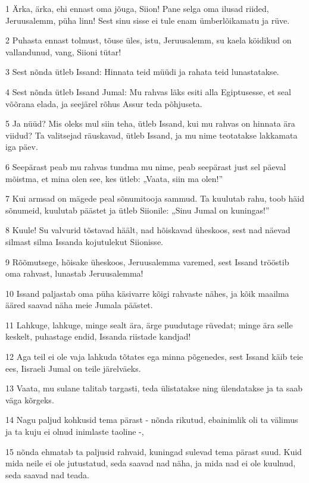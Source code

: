 \par 1 Ärka, ärka, ehi ennast oma jõuga, Siion! Pane selga oma ilusad riided, Jeruusalemm, püha linn! Sest sinu sisse ei tule enam ümberlõikamatu ja rüve.
\par 2 Puhasta ennast tolmust, tõuse üles, istu, Jeruusalemm, su kaela köidikud on vallandunud, vang, Siioni tütar!
\par 3 Sest nõnda ütleb Issand: Hinnata teid müüdi ja rahata teid lunastatakse.
\par 4 Sest nõnda ütleb Issand Jumal: Mu rahvas läks esiti alla Egiptusesse, et seal võõrana elada, ja seejärel rõhus Assur teda põhjuseta.
\par 5 Ja nüüd? Mis oleks mul siin teha, ütleb Issand, kui mu rahvas on hinnata ära viidud? Ta valitsejad räuskavad, ütleb Issand, ja mu nime teotatakse lakkamata iga päev.
\par 6 Seepärast peab mu rahvas tundma mu nime, peab seepärast just sel päeval mõistma, et mina olen see, kes ütleb: „Vaata, siin ma olen!”
\par 7 Kui armsad on mägede peal sõnumitooja sammud. Ta kuulutab rahu, toob häid sõnumeid, kuulutab päästet ja ütleb Siionile: „Sinu Jumal on kuningas!”
\par 8 Kuule! Su valvurid tõstavad häält, nad hõiskavad üheskoos, sest nad näevad silmast silma Issanda kojutulekut Siionisse.
\par 9 Rõõmutsege, hõisake üheskoos, Jeruusalemma varemed, sest Issand trööstib oma rahvast, lunastab Jeruusalemma!
\par 10 Issand paljastab oma püha käsivarre kõigi rahvaste nähes, ja kõik maailma ääred saavad näha meie Jumala päästet.
\par 11 Lahkuge, lahkuge, minge sealt ära, ärge puudutage rüvedat; minge ära selle keskelt, puhastage endid, Issanda riistade kandjad!
\par 12 Aga teil ei ole vaja lahkuda tõtates ega minna põgenedes, sest Issand käib teie ees, Iisraeli Jumal on teile järelväeks.
\par 13 Vaata, mu sulane talitab targasti, teda ülistatakse ning ülendatakse ja ta saab väga kõrgeks.
\par 14 Nagu paljud kohkusid tema pärast - nõnda rikutud, ebainimlik oli ta välimus ja ta kuju ei olnud inimlaste taoline -,
\par 15 nõnda ehmatab ta paljusid rahvaid, kuningad sulevad tema pärast suud. Kuid mida neile ei ole jutustatud, seda saavad nad näha, ja mida nad ei ole kuulnud, seda saavad nad teada.

